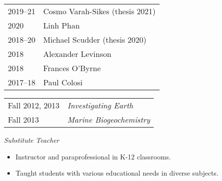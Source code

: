 \begin{tabular}{ll}
	2019--21 & Cosmo Varah-Sikes (thesis 2021)\\
	2020 & Linh Phan \\
	2018--20 & Michael Scudder (thesis 2020) \\
	2018 & Alexander Levinson \\
	2018 & Frances O'Byrne \\
	2017--18 & Paul Colosi
\end{tabular}

\begin{tabular}{p{.15\linewidth} p{.85\linewidth}} %
Fall 2012, 2013 & \textit{Investigating Earth}\\
Fall 2013 & \textit{Marine Biogeochemistry}
\end{tabular}

\textit{Substitute Teacher}
\begin{itemize}
	\item Instructor and paraprofessional in K-12 classrooms.
	\item Taught students with various educational needs in diverse subjects.
\end{itemize}